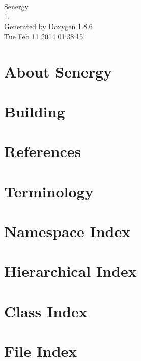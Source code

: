 \documentclass[twoside]{book}
\newcommand{\clearemptydoublepage}{%
  \newpage{\pagestyle{empty}\cleardoublepage}%
}
\begin{document}
\hypersetup{pageanchor=false}
\begin{titlepage}
\vspace*{7cm}
\begin{center}%
{\Large Senergy \\[1ex]\large 1. }\\
\vspace*{1cm}
{\large Generated by Doxygen 1.8.6}\\
\vspace*{0.5cm}
{\small Tue Feb 11 2014 01:38:15}\\
\end{center}
\end{titlepage}
\clearemptydoublepage
\tableofcontents
\clearemptydoublepage
{}
\hypersetup{pageanchor=true}

\chapter{About Senergy}
\label{index}\hypertarget{index}{}
\chapter{Building}
\label{building}
\hypertarget{building}{}

\chapter{References}
\label{references}
\hypertarget{references}{}

\chapter{Terminology}
\label{terminology}
\hypertarget{terminology}{}

\chapter{Namespace Index}

\chapter{Hierarchical Index}

\chapter{Class Index}

\chapter{File Index}

\end{document}
